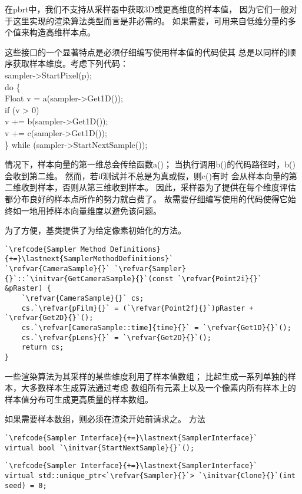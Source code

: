 在pbrt中，我们不支持从采样器中获取3D或更高维度的样本值，
因为它们一般对于这里实现的渲染算法类型而言是非必需的。
如果需要，可用来自低维分量的多个值来构造高维样本点。

这些接口的一个显著特点是必须仔细编写使用样本值的代码使其
总是以同样的顺序获取样本维度。考虑下列代码：\\
{\ttfamily
sampler->StartPixel(p);\\
do \{\\
        \indent Float v = a(sampler->Get1D());\\
        \indent if (v > 0)\\
        \indent \indent v += b(sampler->Get1D());\\
        \indent v += c(sampler->Get1D());\\
\} while (sampler->StartNextSample());
}

情况下，样本向量的第一维总会传给函数{\ttfamily a()}；
当执行调用{\ttfamily b()}的代码路径时，{\ttfamily b()}会收到第二维。
然而，若{\ttfamily if}测试并不总是为真或假，则{\ttfamily c()}有时
会从样本向量的第二维收到样本，否则从第三维收到样本。
因此，采样器为了提供在每个维度评估都分布良好的样本点所作的努力就白费了。
故需要仔细编写使用的代码使得它始终如一地用掉样本向量维度以避免该问题。

为了方便，基类提供了为给定像素初始化的方法。
\begin{lstlisting}
`\refcode{Sampler Method Definitions}{+=}\lastnext{SamplerMethodDefinitions}`
`\refvar{CameraSample}{}` `\refvar{Sampler}{}`::`\initvar{GetCameraSample}{}`(const `\refvar{Point2i}{}` &pRaster) {
    `\refvar{CameraSample}{}` cs;
    cs.`\refvar{pFilm}{}` = (`\refvar{Point2f}{}`)pRaster + `\refvar{Get2D}{}`();
    cs.`\refvar[CameraSample::time]{time}{}` = `\refvar{Get1D}{}`();
    cs.`\refvar{pLens}{}` = `\refvar{Get2D}{}`();
    return cs;
}
\end{lstlisting}

一些渲染算法为其采样的某些维度利用了样本值数组；
比起生成一系列单独的样本，大多数样本生成算法通过考虑
数组所有元素上以及一个像素内所有样本上的样本值分布可生成更高质量的样本数组。

如果需要样本数组，则必须在渲染开始前请求之。
方法

\begin{lstlisting}
`\refcode{Sampler Interface}{+=}\lastnext{SamplerInterface}`
virtual bool `\initvar{StartNextSample}{}`();
\end{lstlisting}
\begin{lstlisting}
`\refcode{Sampler Interface}{+=}\lastnext{SamplerInterface}`
virtual std::unique_ptr<`\refvar{Sampler}{}`> `\initvar{Clone}{}`(int seed) = 0;
\end{lstlisting}